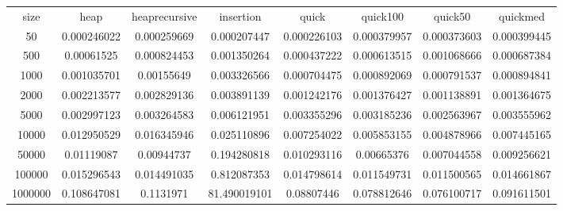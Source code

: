 \begin{table}
\begin{tabular}{cccccccc}
size & heap & heaprecursive & insertion & quick & quick100 & quick50 & quickmed \\
50 & 0.000246022 & 0.000259669 & 0.000207447 & 0.000226103 & 0.000379957 & 0.000373603 & 0.000399445 \\
500 & 0.00061525 & 0.000824453 & 0.001350264 & 0.000437222 & 0.000613515 & 0.001068666 & 0.000687384 \\
1000 & 0.001035701 & 0.00155649 & 0.003326566 & 0.000704475 & 0.000892069 & 0.000791537 & 0.000894841 \\
2000 & 0.002213577 & 0.002829136 & 0.003891139 & 0.001242176 & 0.001376427 & 0.001138891 & 0.001364675 \\
5000 & 0.002997123 & 0.003264583 & 0.006121951 & 0.003355296 & 0.003185236 & 0.002563967 & 0.003555962 \\
10000 & 0.012950529 & 0.016345946 & 0.025110896 & 0.007254022 & 0.005853155 & 0.004878966 & 0.007445165 \\
50000 & 0.01119087 & 0.00944737 & 0.194280818 & 0.010293116 & 0.00665376 & 0.007044558 & 0.009256621 \\
100000 & 0.015296543 & 0.014491035 & 0.812087353 & 0.014798614 & 0.011549731 & 0.011500565 & 0.014661867 \\
1000000 & 0.108647081 & 0.1131971 & 81.490019101 & 0.08807446 & 0.078812646 & 0.076100717 & 0.091611501 \\
\end{tabular}
\end{table}

